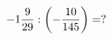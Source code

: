 \documentclass[preview]{standalone}
\begin{document}
\begin{align*}
-1 { 9 \over 29 }  :  \left( - { 10 \over 145 } \right) =  ?
\end{align*}
\end{document}
